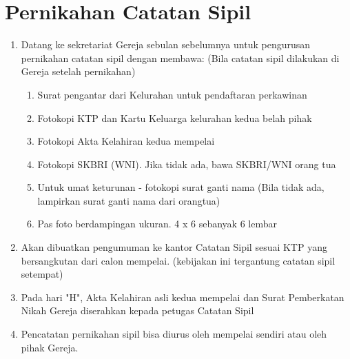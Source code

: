 \section{Pernikahan Catatan Sipil}
\begin{enumerate}
\item    Datang ke sekretariat Gereja sebulan sebelumnya untuk pengurusan pernikahan catatan sipil dengan membawa: (Bila catatan sipil dilakukan di Gereja setelah pernikahan)
\begin{enumerate}
\item        Surat pengantar dari Kelurahan untuk pendaftaran perkawinan
\item        Fotokopi KTP dan Kartu Keluarga kelurahan kedua belah pihak
\item        Fotokopi Akta Kelahiran kedua mempelai
\item        Fotokopi SKBRI (WNI). Jika tidak ada, bawa SKBRI/WNI orang tua
\item        Untuk umat keturunan - fotokopi surat ganti nama (Bila tidak ada, lampirkan surat ganti nama dari orangtua)  
\item        Pas foto berdampingan ukuran. 4 x 6 sebanyak 6 lembar
\end{enumerate}
\item    Akan dibuatkan pengumuman ke kantor Catatan Sipil sesuai KTP yang bersangkutan dari calon mempelai. (kebijakan ini tergantung catatan sipil setempat)
\item    Pada hari "H", Akta Kelahiran asli kedua mempelai dan Surat Pemberkatan Nikah Gereja diserahkan kepada petugas Catatan Sipil
\item    Pencatatan pernikahan sipil bisa diurus oleh mempelai sendiri atau oleh pihak Gereja.
\end{enumerate}
